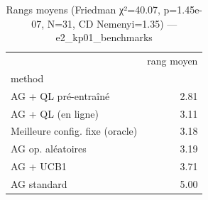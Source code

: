 \begin{table}
\caption{Rangs moyens (Friedman χ²=40.07, p=1.45e-07, N=31, CD Nemenyi=1.35) — e2_kp01_benchmarks}
\label{tab:friedman_rangs}
\begin{tabular}{lr}
\toprule
 & rang moyen \\
method &  \\
\midrule
AG + QL pré-entraîné & 2.81 \\
AG + QL (en ligne) & 3.11 \\
Meilleure config. fixe (oracle) & 3.18 \\
AG op. aléatoires & 3.19 \\
AG + UCB1 & 3.71 \\
AG standard & 5.00 \\
\bottomrule
\end{tabular}
\end{table}

